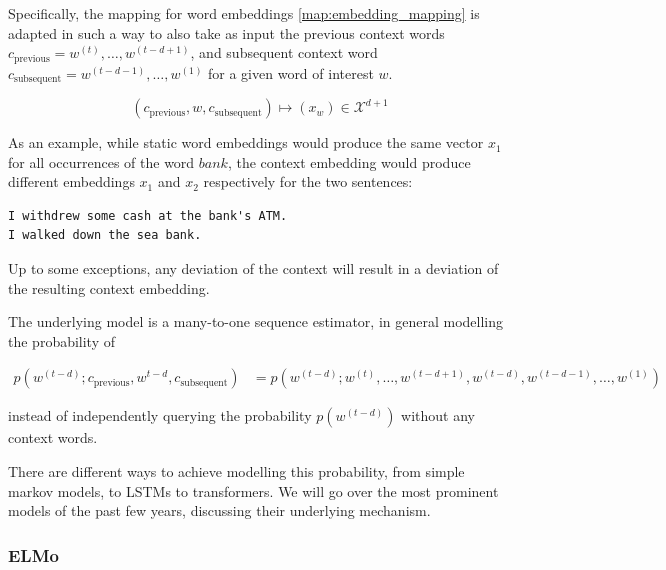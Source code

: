 \documentclass[a4paper,12pt,twoside,openright]{report}
\begin{document}
Specifically, the mapping for word embeddings \eqref{map:embedding_mapping} is adapted in such a way to also take as input the previous context words $c_\text{previous} = w^{(t)}, \ldots, w^{(t-d + 1)}$, and subsequent context word $c_\text{subsequent} = w^{(t-d - 1)}, \ldots, w^{(1)}$ for a given word of interest $w$.

\begin{equation}
(c_\text{previous}, w, c_\text{subsequent}) \mapsto (x_w) \in \mathcal{X}^{d + 1}
\end{equation}{\label{map:context_embedding_mapping}}

As an example, while static word embeddings would produce the same vector $x_1$ for all occurrences of the word $bank$, the context embedding would produce different embeddings $x_1$ and $x_2$ respectively for the two sentences:

\begin{verbatim}
I withdrew some cash at the bank's ATM.
I walked down the sea bank.
\end{verbatim}

Up to some exceptions, any deviation of the context will result in a deviation of the resulting context embedding.


The underlying model is a many-to-one sequence estimator, in general modelling the probability of 

\begin{align}
p(w^{(t-d)}; c_\text{previous}, w^{t-d}, c_\text{subsequent}) &= p(w^{(t-d)}; w^{(t)}, \ldots, w^{(t-d + 1)}, w^{(t-d)}, w^{(t-d - 1)}, \ldots, w^{(1)})
\end{align}{\label{eq:transformer_probability}}

instead of independently querying the probability $p(w^{(t-d)})$ without any context words.

There are different ways to achieve modelling this probability, from simple markov models, to LSTMs to transformers.
We will go over the most prominent models of the past few years, discussing their underlying mechanism.

\subsubsection{ELMo}

\end{document}
